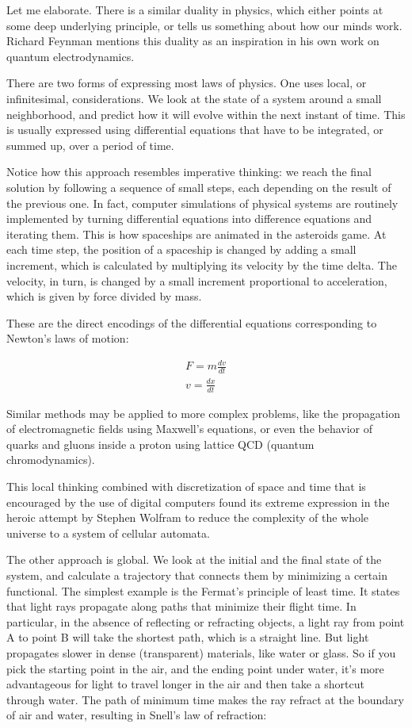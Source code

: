 Let me elaborate. There is a similar duality in physics, which either
points at some deep underlying principle, or tells us something about
how our minds work. Richard Feynman mentions this duality as an
inspiration in his own work on quantum electrodynamics.

There are two forms of expressing most laws of physics. One uses local,
or infinitesimal, considerations. We look at the state of a system
around a small neighborhood, and predict how it will evolve within the
next instant of time. This is usually expressed using differential
equations that have to be integrated, or summed up, over a period of
time.

Notice how this approach resembles imperative thinking: we reach the
final solution by following a sequence of small steps, each depending on
the result of the previous one. In fact, computer simulations of
physical systems are routinely implemented by turning differential
equations into difference equations and iterating them. This is how
spaceships are animated in the asteroids game. At each time step, the
position of a spaceship is changed by adding a small increment, which is
calculated by multiplying its velocity by the time delta. The velocity,
in turn, is changed by a small increment proportional to acceleration,
which is given by force divided by mass.

These are the direct encodings of the differential equations
corresponding to Newton's laws of motion:

\begin{equation}
\begin{split}
F = m \frac{dv}{dt} \\
v = \frac{dx}{dt}
\end{split}
\end{equation}

\noindent
Similar methods may be applied to more complex problems, like the
propagation of electromagnetic fields using Maxwell's equations, or even
the behavior of quarks and gluons inside a proton using lattice QCD
(quantum chromodynamics).

This local thinking combined with discretization of space and time that
is encouraged by the use of digital computers found its extreme
expression in the heroic attempt by Stephen Wolfram to reduce the
complexity of the whole universe to a system of cellular automata.

The other approach is global. We look at the initial and the final state
of the system, and calculate a trajectory that connects them by
minimizing a certain functional. The simplest example is the Fermat's
principle of least time. It states that light rays propagate along paths
that minimize their flight time. In particular, in the absence of
reflecting or refracting objects, a light ray from point A to point B
will take the shortest path, which is a straight line. But light
propagates slower in dense (transparent) materials, like water or glass.
So if you pick the starting point in the air, and the ending point under
water, it's more advantageous for light to travel longer in the air and
then take a shortcut through water. The path of minimum time makes the
ray refract at the boundary of air and water, resulting in Snell's law
of refraction:

